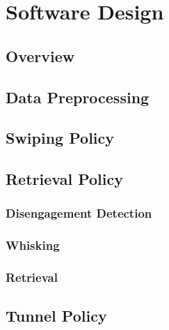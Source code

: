 

\chapter{Software Design}


\section{Overview}


\section{Data Preprocessing}


\section{Swiping Policy}


\section{Retrieval Policy}

\subsection{Disengagement Detection}

\subsection{Whisking}

\subsection{Retrieval}


\section{Tunnel Policy}


\section{}
